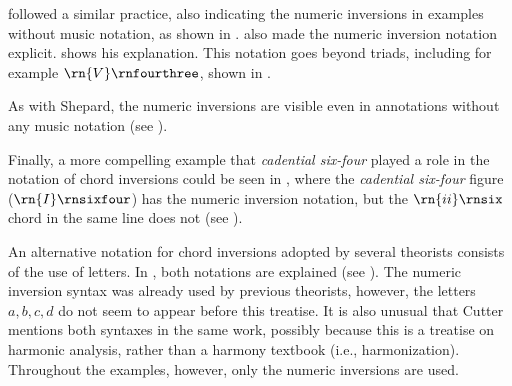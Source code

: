 
\textcite{chadwick1897harmony} followed a similar practice,
also indicating the numeric inversions in examples without
music notation, as shown in
.
\textcite{chadwick1897harmony} also made the numeric
inversion notation explicit.
shows his explanation. This notation goes beyond triads,
including for example $\rn{V}\rnfourthree$, shown in
.




As with Shepard, the numeric inversions are visible even in
annotations without any music notation (see ).



Finally, a more compelling example that \emph{cadential
six-four} played a role in the notation of chord inversions
could be seen in \textcite{loewengard1908lehrbuch}, where
the \emph{cadential six-four} figure ($\rn{I}\rnsixfour$)
has the numeric inversion notation, but the $\rn{ii}\rnsix$
chord in the same line does not (see
).


An alternative notation for chord inversions adopted by
several theorists consists of the use of letters. In
\textcite{cutter1902harmonic}, both notations are explained
(see ). The
numeric inversion syntax was already used by previous
theorists, however, the letters ${a, b, c , d}$ do not seem
to appear before this treatise. It is also unusual that
Cutter mentions both syntaxes in the same work, possibly
because this is a treatise on harmonic analysis, rather than
a harmony textbook (i.e., harmonization). Throughout the
examples, however, only the numeric inversions are used.

